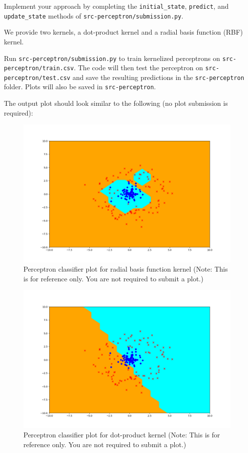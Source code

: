 \item {} Implement your approach by completing the
\texttt{initial\_state}, \texttt{predict}, and \texttt{update\_state} methods
of \texttt{src-perceptron/submission.py}.


We provide two kernels, a dot-product kernel and a
radial basis function (RBF) kernel. 

Run \texttt{src-perceptron/submission.py} to train
kernelized perceptrons on \texttt{src-perceptron/train.csv}. The code will then test
the perceptron on \texttt{src-perceptron/test.csv} and save the resulting
predictions in the \texttt{src-perceptron} folder. Plots will also be saved in
\texttt{src-perceptron}.

The output plot should look similar to the following (no plot submission is required):
\begin{figure}[H]
	\centering
	\vspace{2mm}
	\includegraphics[width=0.65\linewidth]{03-perceptron/perceptron_rbf_output.png}
    \caption{Perceptron classifier plot for radial basis function kernel (Note: This is for reference only. You are not required to submit a plot.)}
\end{figure}

\begin{figure}[H]
	\centering
	\vspace{2mm}
	\includegraphics[width=0.65\linewidth]{03-perceptron/perceptron_dot_output.png}
    \caption{Perceptron classifier plot for dot-product kernel (Note: This is for reference only. You are not required to submit a plot.)}
\end{figure}